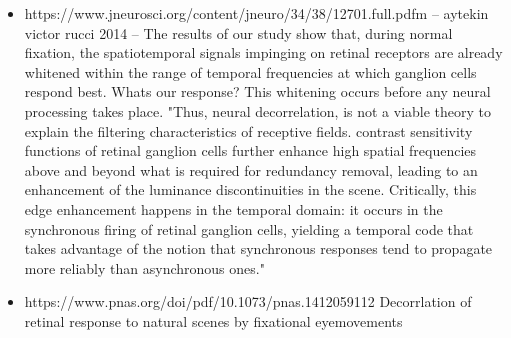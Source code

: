 \documentclass[12pt]{article}
\begin{document}
{\begin{itemize}
    \item https://www.jneurosci.org/content/jneuro/34/38/12701.full.pdfm -- aytekin victor rucci 2014 -- The results of our study show that, during normal fixation, the spatiotemporal signals impinging on retinal receptors are already whitened within the range of temporal frequencies at which ganglion cells respond best. Whats our response? This whitening occurs before any neural processing takes place. "Thus, neural decorrelation, is not a viable theory to explain the filtering characteristics of receptive fields. contrast sensitivity functions of retinal ganglion cells further enhance high spatial frequencies above and beyond what is required for redundancy removal, leading to an enhancement of the luminance discontinuities in the scene. Critically, this edge enhancement happens in the temporal domain: it occurs in the synchronous firing of retinal ganglion cells, yielding a temporal code that takes advantage of the notion that synchronous responses tend to propagate more reliably than asynchronous ones."
    \item https://www.pnas.org/doi/pdf/10.1073/pnas.1412059112 Decorrlation of retinal response to natural scenes by fixational eyemovements
\end{itemize}
}
\end{document}
